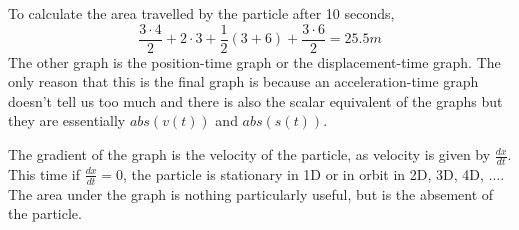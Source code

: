 \documentclass{article}
\begin{document}
{To calculate the area travelled by the particle after 10 seconds, \[\frac{3\cdot4}{2}+2\cdot3+\frac{1}{2}(3+6)+\frac{3\cdot6}{2}=25.5m\]}
{The other graph is the position-time graph or the displacement-time graph. The only reason that this is the final graph is because an acceleration-time graph doesn't tell us too much and there is also the scalar equivalent of the graphs but they are essentially $abs(v(t))$ and $abs(s(t))$.}
\begin{center}
    \begin{figure}[h]
    \end{figure}
\end{center}
{The gradient of the graph is the velocity of the particle, as velocity is given by $\frac{dx}{dt}$. This time if $\frac{dx}{dt}=0$, the particle is stationary in 1D or in orbit in 2D, 3D, 4D, $\ldots$. The area under the graph is nothing particularly useful, but is the absement of the particle.}
\end{document}
